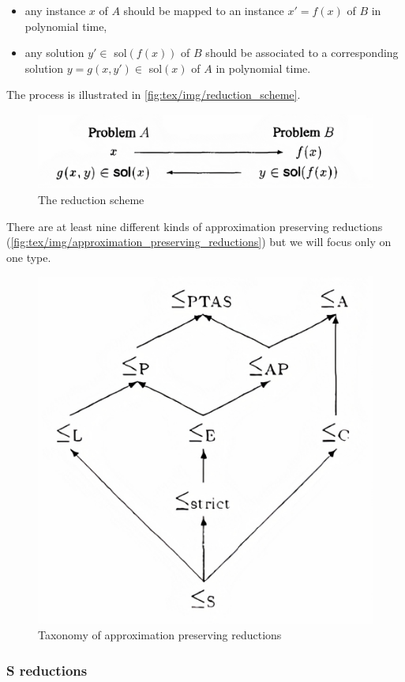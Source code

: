 \begin{itemize}
	\item any instance $x$ of $A$ should be mapped to an instance $x' = f(x)$
	      of $B$ in polynomial time,
	\item any solution $y' \in $ sol$(f(x))$ of $B$ should be associated to a corresponding
	      solution $y = g(x, y') \in $ sol$(x)$ of $A$ in polynomial time.
\end{itemize}

The process is illustrated in \autoref{fig:tex/img/reduction_scheme}.

\begin{figure}
	\centering
	\includegraphics[width=0.6\linewidth]{tex/img/reduction_scheme.png}
	\caption[Reduction process]{The reduction scheme \cite{Crescenzi1997ASG}}%
	\label{fig:tex/img/reduction_scheme}
\end{figure}

There are at least nine different kinds of approximation preserving reductions
\cite{DemaineFall2014}(\autoref{fig:tex/img/approximation_preserving_reductions}) but we will
focus only on one type.

\begin{figure}[b]
	\centering
	\includegraphics[width=0.4\linewidth]{tex/img/approximation_preserving_reductions.png}
	\caption[Taxonomy of approximation preserving reductions]{Taxonomy of approximation preserving reductions \cite{Crescenzi1997ASG}}%
	\label{fig:tex/img/approximation_preserving_reductions}
\end{figure}

\subsubsection{S reductions}%
\label{sub:strict_reductions}

